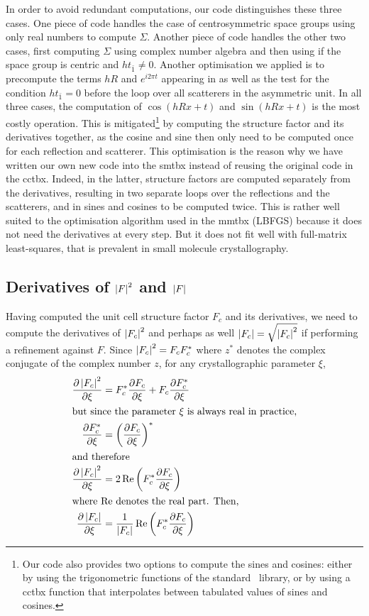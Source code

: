 \documentclass{iucr}
\begin{document}
In order to avoid redundant computations, our code distinguishes these three cases. One piece of code handles the case of centrosymmetric space groups using only real numbers to compute $\Sigma$. Another piece of code handles the other two cases, first computing $\Sigma$ using complex number algebra and then using  if the space group is centric and $h t_{\bar{1}} \neq 0$. Another optimisation we applied is to precompute the terms $hR$ and $e^{i2\pi t}$ appearing in  as well as the test for the condition $h t_{\bar{1}}=0$ before the loop over all scatterers in the asymmetric unit. In all three cases, the computation of $\cos(hRx + t)$ and $\sin(hRx + t)$ is the most costly operation. This is mitigated\footnote{Our code also provides two options to compute the sines and cosines: either by using the trigonometric functions of the standard \cpp\ library, or by using a cctbx function that interpolates between tabulated values of sines and cosines.
} by computing the structure factor and its derivatives together, as the cosine and sine then only need to be computed once for each reflection and scatterer.
This optimisation is the reason why we have written our own new code into the smtbx instead of reusing the original code in the cctbx. Indeed, in the latter, structure factors are computed separately from the derivatives, resulting in two separate loops over the reflections and the scatterers, and in sines and cosines to be computed twice. This is rather well suited to the optimisation algorithm used in the mmtbx (LBFGS) because it does not need the derivatives at every step. But it does not fit well with full-matrix least-squares, that is prevalent in small molecule crystallography.  

\subsection{Derivatives of $\left| F \right|^2$ and $\left| F \right|$}

Having computed the unit cell structure factor $F_c$ and its derivatives, we need to compute the derivatives of $\left| F_c \right|^2$ and perhaps as well $\left| F_c \right| = \sqrt{\left| F_c \right|^2}$ if performing a refinement against $F$. Since $\left| F_c \right|^2 = F_c F_c^*$ where $z^*$ denotes the complex conjugate of the complex number $z$, for any crystallographic parameter $\xi$,
\begin{align}
\frac{\partial \left| F_c \right|^2}{\partial \xi} &= F_c^* \frac{\partial F_c}{\partial \xi} + F_c \frac{\partial F_c^*}{\partial \xi} \nonumber \\
\intertext{but since the parameter $\xi$ is always real in practice,}
\frac{\partial F_c^*}{\partial \xi} &= \left( \frac{\partial F_c}{\partial \xi} \right)^* \\
\intertext{and therefore}
\frac{\partial \left| F_c \right|^2}{\partial \xi} &= 2\operatorname{Re}\left( F_c^* \frac{\partial F_c}{\partial \xi}\right) \\
\intertext{where $\operatorname{Re}$ denotes the real part. Then,}
\frac{\partial \left| F_c \right|}{\partial \xi} &= \frac{1}{\left| F_c \right|} \operatorname{Re}\left( F_c^* \frac{\partial F_c}{\partial \xi}\right)
\end{align}
\end{document}
